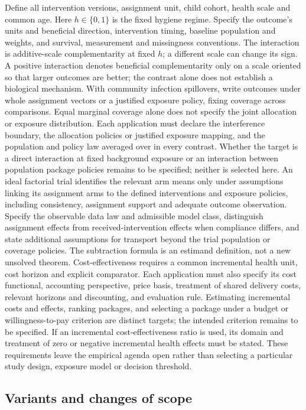 \documentclass[11pt,a4paper]{article}
\begin{document}
Define all intervention versions, assignment unit, child cohort, health scale and common age. Here \(h\in\{0,1\}\) is the fixed hygiene regime. Specify the outcome's units and beneficial direction, intervention timing, baseline population and weights, and survival, measurement and missingness conventions. The interaction is additive-scale complementarity at fixed \(h\); a different scale can change its sign. A positive interaction denotes beneficial complementarity only on a scale oriented so that larger outcomes are better; the contrast alone does not establish a biological mechanism. With community infection spillovers, write outcomes under whole assignment vectors or a justified exposure policy, fixing coverage across comparisons. Equal marginal coverage alone does not specify the joint allocation or exposure distribution. Each application must declare the interference boundary, the allocation policies or justified exposure mapping, and the population and policy law averaged over in every contrast. Whether the target is a direct interaction at fixed background exposure or an interaction between population package policies remains to be specified; neither is selected here. An ideal factorial trial identifies the relevant arm means only under assumptions linking its assignment arms to the defined interventions and exposure policies, including consistency, assignment support and adequate outcome observation. Specify the observable data law and admissible model class, distinguish assignment effects from received-intervention effects when compliance differs, and state additional assumptions for transport beyond the trial population or coverage policies. The subtraction formula is an estimand definition, not a new unsolved theorem. Cost-effectiveness requires a common incremental health unit, cost horizon and explicit comparator. Each application must also specify its cost functional, accounting perspective, price basis, treatment of shared delivery costs, relevant horizons and discounting, and evaluation rule. Estimating incremental costs and effects, ranking packages, and selecting a package under a budget or willingness-to-pay criterion are distinct targets; the intended criterion remains to be specified. If an incremental cost-effectiveness ratio is used, its domain and treatment of zero or negative incremental health effects must be stated. These requirements leave the empirical agenda open rather than selecting a particular study design, exposure model or decision threshold.

\subsection*{Variants and changes of scope}
\end{document}
